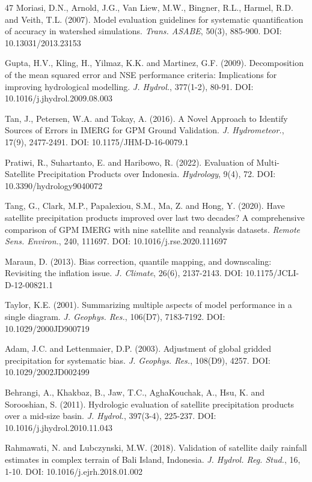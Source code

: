 \documentclass[
]{article}
\begin{document}
\begin{thebibliography}{47}
 Moriasi, D.N., Arnold, J.G., Van Liew, M.W., Bingner, R.L.,
Harmel, R.D. and Veith, T.L. (2007). Model evaluation guidelines for
systematic quantification of accuracy in watershed simulations.
\emph{Trans. ASABE}, 50(3), 885-900. DOI: 10.13031/2013.23153

 Gupta, H.V., Kling, H., Yilmaz, K.K. and Martinez, G.F. (2009).
Decomposition of the mean squared error and NSE performance criteria:
Implications for improving hydrological modelling. \emph{J. Hydrol.},
377(1-2), 80-91. DOI: 10.1016/j.jhydrol.2009.08.003

 Tan, J., Petersen, W.A. and Tokay, A. (2016). A Novel Approach
to Identify Sources of Errors in IMERG for GPM Ground Validation.
\emph{J. Hydrometeor.}, 17(9), 2477-2491. DOI: 10.1175/JHM-D-16-0079.1

 Pratiwi, R., Suhartanto, E. and Haribowo, R. (2022). Evaluation
of Multi-Satellite Precipitation Products over Indonesia.
\emph{Hydrology}, 9(4), 72. DOI: 10.3390/hydrology9040072

 Tang, G., Clark, M.P., Papalexiou, S.M., Ma, Z. and Hong, Y.
(2020). Have satellite precipitation products improved over last two
decades? A comprehensive comparison of GPM IMERG with nine satellite and
reanalysis datasets. \emph{Remote Sens. Environ.}, 240, 111697. DOI:
10.1016/j.rse.2020.111697

 Maraun, D. (2013). Bias correction, quantile mapping, and
downscaling: Revisiting the inflation issue. \emph{J. Climate}, 26(6),
2137-2143. DOI: 10.1175/JCLI-D-12-00821.1

 Taylor, K.E. (2001). Summarizing multiple aspects of model
performance in a single diagram. \emph{J. Geophys. Res.}, 106(D7),
7183-7192. DOI: 10.1029/2000JD900719

 Adam, J.C. and Lettenmaier, D.P. (2003). Adjustment of global
gridded precipitation for systematic bias. \emph{J. Geophys. Res.},
108(D9), 4257. DOI: 10.1029/2002JD002499

 Behrangi, A., Khakbaz, B., Jaw, T.C., AghaKouchak, A., Hsu, K.
and Sorooshian, S. (2011). Hydrologic evaluation of satellite
precipitation products over a mid-size basin. \emph{J. Hydrol.},
397(3-4), 225-237. DOI: 10.1016/j.jhydrol.2010.11.043

 Rahmawati, N. and Lubczynski, M.W. (2018). Validation of
satellite daily rainfall estimates in complex terrain of Bali Island,
Indonesia. \emph{J. Hydrol. Reg. Stud.}, 16, 1-10. DOI:
10.1016/j.ejrh.2018.01.002


\end{thebibliography}
\end{document}
